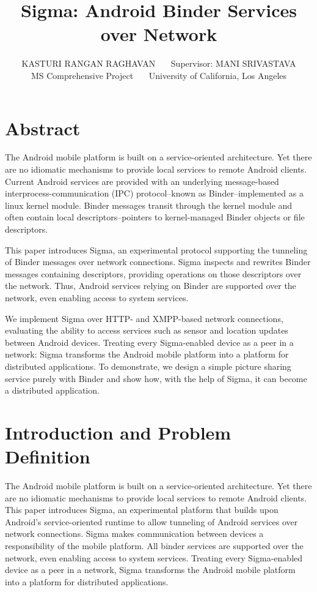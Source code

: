 \documentclass[prodmode]{acmlarge}
\title{Sigma: Android Binder Services over Network}
\author{KASTURI RANGAN RAGHAVAN~~~
Supervisor: MANI SRIVASTAVA\\
MS Comprehensive Project~~~
University of California, Los Angeles
}
\begin{document}
\pagestyle{plain}
\maketitle
\tableofcontents

\clearpage

\section{Abstract}
The Android mobile platform is built on a service-oriented architecture. Yet there are no idiomatic mechanisms to provide local services to remote Android clients. Current Android services are provided with an underlying message-based interprocess-communication (IPC) protocol--known as Binder--implemented as a linux kernel module. Binder messages transit through the kernel module and often contain local descriptors--pointers to kernel-managed Binder objects or file descriptors.

This paper introduces Sigma, an experimental protocol supporting the tunneling of Binder messages over network connections. Sigma inspects and rewrites Binder messages containing descriptors, providing operations on those descriptors over the network. Thus, Android services relying on Binder are supported over the network, even enabling access to system services.

We implement Sigma over HTTP- and XMPP-based network connections, evaluating the ability to access services such as sensor and location updates between Android devices. Treating every Sigma-enabled device as a peer in a network: Sigma transforms the Android mobile platform into a platform for distributed applications. To demonstrate, we design a simple picture sharing service purely with Binder and show how, with the help of Sigma, it can become a distributed application.

\section{Introduction and Problem Definition}

The Android mobile platform is built on a service-oriented architecture. Yet there are no idiomatic mechanisms to provide local services to remote Android clients. This paper introduces Sigma, an experimental platform that builds upon Android's service-oriented runtime to allow tunneling of Android services over network connections. Sigma makes communication between devices a responsibility of the mobile platform. All binder services are supported over the network, even enabling access to system services. Treating every Sigma-enabled device as a peer in a network, Sigma transforms the Android mobile platform into a platform for distributed applications.
\end{document}

